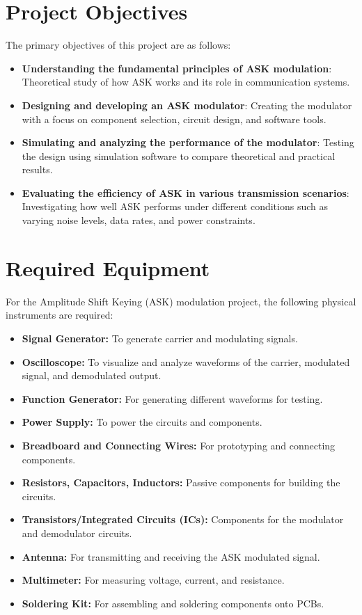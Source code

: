\documentclass[12pt,a4paper]{article}
\begin{document}
\section*{Project Objectives}
The primary objectives of this project are as follows:
\begin{itemize}
    \item \textbf{Understanding the fundamental principles of ASK modulation}: Theoretical study of how ASK works and its role in communication systems.
    \item \textbf{Designing and developing an ASK modulator}: Creating the modulator with a focus on component selection, circuit design, and software tools.
    \item \textbf{Simulating and analyzing the performance of the modulator}: Testing the design using simulation software to compare theoretical and practical results.
    \item \textbf{Evaluating the efficiency of ASK in various transmission scenarios}: Investigating how well ASK performs under different conditions such as varying noise levels, data rates, and power constraints.
\end{itemize}

\section*{Required Equipment}

For the Amplitude Shift Keying (ASK) modulation project, the following physical instruments are required:

\begin{itemize}
    \item \textbf{Signal Generator:} To generate carrier and modulating signals.
    \item \textbf{Oscilloscope:} To visualize and analyze waveforms of the carrier, modulated signal, and demodulated output.
    \item \textbf{Function Generator:} For generating different waveforms for testing.
    \item \textbf{Power Supply:} To power the circuits and components.
    \item \textbf{Breadboard and Connecting Wires:} For prototyping and connecting components.
    \item \textbf{Resistors, Capacitors, Inductors:} Passive components for building the circuits.
    \item \textbf{Transistors/Integrated Circuits (ICs):} Components for the modulator and demodulator circuits.
    \item \textbf{Antenna:} For transmitting and receiving the ASK modulated signal.
    \item \textbf{Multimeter:} For measuring voltage, current, and resistance.
    \item \textbf{Soldering Kit:} For assembling and soldering components onto PCBs.
\end{itemize}
\end{document}
